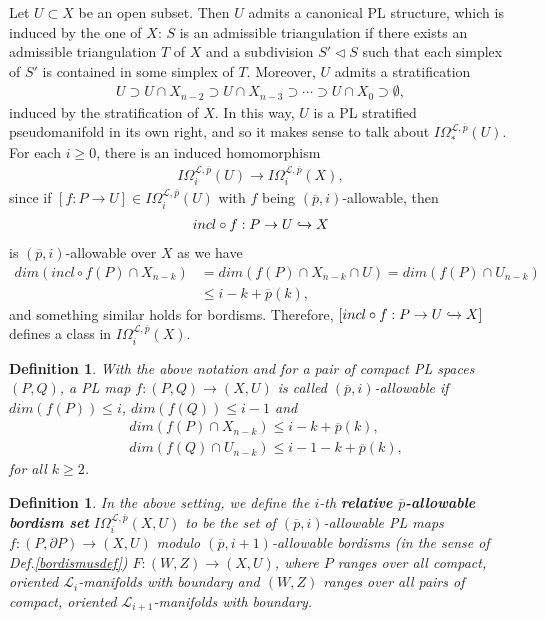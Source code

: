 \documentclass{scrreprt}
\newtheorem{definition}[prop]{Definition}
\begin{document}
Let $U \subset X$ be an open subset. Then $U$ admits a canonical PL structure, which is induced by the one of $X$: $S$ is an admissible triangulation if there exists an admissible triangulation $T$ of $X$ and a subdivision $S' \lhd S$ such that each simplex of $S'$ is contained in some simplex of $T$. Moreover, $U$ admits a stratification
\begin{align*}
U \supset U \cap X_{n-2} \supset U \cap X_{n-3} \supset \cdots \supset U \cap X_{0} \supset \emptyset,
\end{align*}
induced by the stratification of $X$. In this way, $U$ is a PL stratified pseudomanifold in its own right, and so it makes sense to talk about $I\Omega_*^{\mathcal{L},\overline{p}}(U)$. For each $i \geq 0$, there is an induced homomorphism
\begin{align*}
I\Omega_i^{\mathcal{L},\overline{p}}(U) \to I\Omega_i^{\mathcal{L},\overline{p}}(X),
\end{align*}
since if $[f: P \to U] \in I\Omega_i^{\mathcal{L},\overline{p}}(U)$ with $f$ being $(\overline{p},i)$-allowable, then 
\begin{align*}
incl \circ f: P \to U \xhookrightarrow{} X
\end{align*}
is $(\overline{p},i)$-allowable over $X$ as we have
\begin{align*}
dim(incl \circ f(P) \cap X_{n-k})&=dim(f(P) \cap X_{n-k} \cap U)=dim(f(P) \cap U_{n-k}) \\
&\leq i-k+ \overline{p}(k),
\end{align*}
and something similar holds for bordisms. Therefore, $[incl \circ f: P \to U \xhookrightarrow{} X]$ defines a class in  $I\Omega_i^{\mathcal{L},\overline{p}}(X)$.

\begin{definition}
With the above notation and for a pair of compact PL spaces $(P, Q)$, a PL map $f: (P, Q) \to (X,U)$ is called $(\overline{p},i)$-allowable if $dim(f(P)) \leq i$,  $dim(f(Q)) \leq i-1$ and 
\begin{align*}
&dim(f(P) \cap X_{n-k}) \leq i-k+ \overline{p}(k), \\
&dim(f(Q) \cap U_{n-k}) \leq i-1-k+ \overline{p}(k),
\end{align*}
for all $k \geq 2$.
\end{definition}

\begin{definition}
In the above setting, we define the $i$-th \textbf{relative $\overline{p}$-allowable bordism set} $I\Omega_i^{\mathcal{L},\overline{p}}(X,U)$ to be the set of $(\overline{p},i)$-allowable PL maps $f: (P,\partial P) \to (X,U)$ modulo $(\overline{p},i+1)$-allowable bordisms (in the sense of Def.\ref{bordismusdef}) $F:(W,Z) \to (X,U)$, where $P$ ranges over all compact, oriented $\mathcal{L}_i$-manifolds with boundary and $(W,Z)$ ranges over all pairs of compact, oriented $\mathcal{L}_{i+1}$-manifolds with boundary.
\end{definition}
\end{document}
